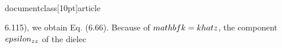 \\documentclass[10pt]{article}
\begin{document}
{{{{6.115), we obtain Eq. (6.66). Because of $\\mathbf{k}=k \\hat{z}$, the component $\\epsilon_{z z}$ of the dielec}}}}
\end{document}
